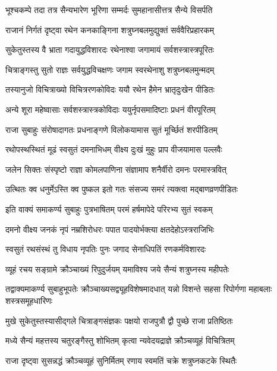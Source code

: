 \twolineshloka
{भूश्चकम्पे तदा तत्र सैन्यभारेण भूरिणा}
{सम्मर्दः सुमहानासीत्तत्र सैन्ये विसर्पति}%

\twolineshloka
{राजानं निर्गतं दृष्ट्वा रथेन कनकाङ्गिना}
{शत्रुघ्नबलमुद्युक्तं सर्ववैरिप्रहारकम्}%

\twolineshloka
{सुकेतुस्तस्य वै भ्राता गदायुद्धविशारदः}
{रथेनाश्वा जगामायं सर्वशस्त्रास्त्रपूरितः}%

\twolineshloka
{चित्राङ्गस्तु सुतो राज्ञः सर्वयुद्धविचक्षणः}
{जगाम स्वरथेनाशु शत्रुघ्नबलमुन्मदम्}%

\twolineshloka
{तस्यानुजो विचित्राख्यो विचित्ररणकोविदः}
{ययौ रथेन हैमेन भ्रातृदुःखेन पीडितः}%

\twolineshloka
{अन्ये शूरा महेष्वासाः सर्वशस्त्रास्त्रकोविदाः}
{ययुर्नृपसमादिष्टाः प्रधनं वीरपूरितम्}%

\twolineshloka
{राजा सुबाहुः संरोषादागतः प्रधनाङ्गणे}
{विलोकयामास सुतं मूर्च्छितं शरपीडितम्}%

\twolineshloka
{रथोपस्थस्थितं मूढं स्वसुतं दमनाभिधम्}
{वीक्ष्य दुःखं मुहुः प्राप वीजयामास पल्लवैः}%

\twolineshloka
{जलेन सिक्तः संस्पृष्टो राज्ञा कोमलपाणिना}
{संज्ञामाप शनैर्वीरो दमनः परमास्त्रवित्}%

\twolineshloka
{उत्थितः क्व धनुर्मेऽस्ति क्व पुष्कल इतो गतः}
{संसज्य समरं त्यक्त्वा मद्बाणव्रणपीडितः}%

\twolineshloka
{इति वाक्यं समाकर्ण्य सुबाहुः पुत्रभाषितम्}
{परमं हर्षमापेदे परिरभ्य सुतं स्वकम्}%

\twolineshloka
{दमनो वीक्ष्य जनकं नृपं नम्रशिरोधरः}
{पपात पादयोर्भक्त्या क्षतदेहोऽस्त्रराजिभिः}%

\twolineshloka
{स्वसुतं रथसंस्थं तु विधाय नृपतिः पुनः}
{जगाद सेनाधिपतिं रणकर्मविशारदः}%

\twolineshloka
{व्यूहं रचय सङ्ग्रामे क्रौञ्चाख्यं रिपुदुर्जयम्}
{यमाविश्य जये सैन्यं शत्रुघ्नस्य महीपतेः}%

\fourlineindentedshloka
{तद्वाक्यमाकर्ण्य सुबाहुभूपतेः}
{क्रौञ्चाख्यसद्व्यूहविशेषमादधात्}
{यन्नो विशन्ते सहसा रिपोर्गणा}
{महाबलाः शस्त्रसमूहधारिणः}%

\twolineshloka
{मुखे सुकेतुस्तस्यासीद्गले चित्राङ्गसंज्ञकः}
{पक्षयो राजपुत्रौ द्वौ पुच्छे राजा प्रतिष्ठितः}%

\twolineshloka
{मध्ये सैन्यं महत्तस्य चतुरङ्गैस्तु शोभितम्}
{कृत्वा न्यवेदयद्राज्ञे क्रौञ्चव्यूहं विचित्रितम्}%

\twolineshloka
{राजा दृष्ट्वा सुसन्नद्धं क्रौञ्चव्यूहं सुनिर्मितम्}
{रणाय स्वमतिं चक्रे शत्रुघ्नकटके स्थितैः}%


